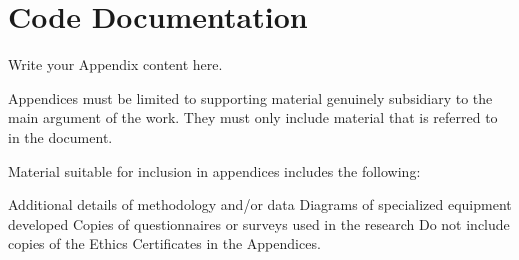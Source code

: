 \chapter{Code Documentation}
\label{app:code_documentation}

Write your Appendix content here.

Appendices must be limited to supporting material genuinely subsidiary to the main argument of the work. They must only include material that is referred to in the document.

Material suitable for inclusion in appendices includes the following:

Additional details of methodology and/or data
Diagrams of specialized equipment developed
Copies of questionnaires or surveys used in the research
Do not include copies of the Ethics Certificates in the Appendices.